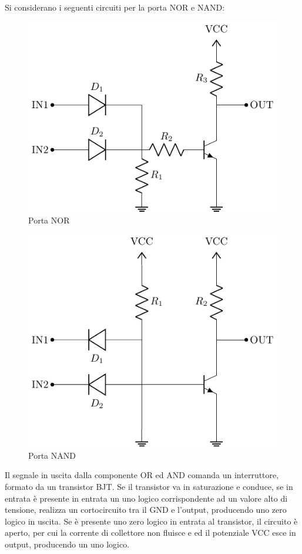 \documentclass{article}
\numberwithin{equation}{subsection}
\begin{document}
Si considerano i seguenti circuiti per la porta NOR e NAND:
\begin{figure}[H]%
    \centering
    \includegraphics{circuito-nor.pdf}%
    \caption{Porta NOR}%
    \label{fig:circuito-nor}
\end{figure}
\begin{figure}[H]%
    \centering
    \includegraphics{circuito-nand.pdf}%
    \caption{Porta NAND}
    \label{fig:circuito-nand}
\end{figure}

Il segnale in uscita dalla componente OR ed AND comanda un interruttore, formato da un transistor BJT. Se il transistor va in saturazione e 
conduce, se in entrata è presente in entrata un uno logico corrispondente ad un valore alto di tensione, realizza un cortocircuito tra il GND e 
l'output, producendo uno zero logico in uscita. Se è presente uno zero logico in entrata al transistor, il circuito è aperto, per cui la corrente 
di collettore non fluisce e ed il potenziale VCC esce in output, producendo un uno logico. 
\end{document}

